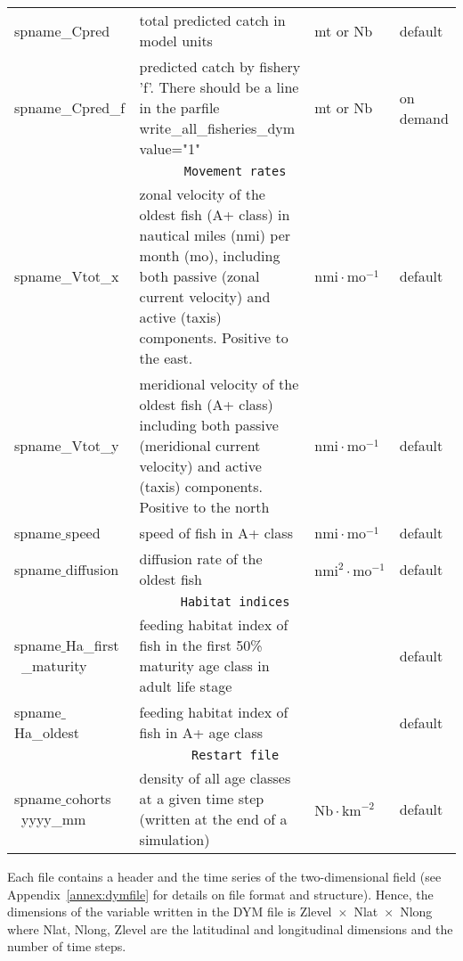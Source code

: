 \begin{longtable}{p{3.25cm}p{8cm}p{2cm}p{1.25cm}}
{\ttfamily spname\_Cpred}& total predicted catch in model units  &mt or Nb & default\\  
{\ttfamily spname\_Cpred\_f}& predicted catch by fishery 'f'. There should be a line in the parfile {\ttfamily write\_all\_fisheries\_dym value="1"} &mt or Nb& on demand\\
 \hline
 \multicolumn{4}{c}{\texttt{ Movement rates}} \\     
 \hline
{\ttfamily spname\_Vtot\_x}& zonal velocity of the oldest fish (A+ class) in nautical miles (nmi) per month (mo), including both passive (zonal current velocity) and active (taxis) components. Positive to the east. & $\text{nmi}\cdot\text{mo}^{-1}$ &  default\\
{\ttfamily spname\_Vtot\_y}& meridional velocity of the oldest fish (A+ class) including both passive (meridional current velocity) and active (taxis) components. Positive to the north & $\text{nmi}\cdot\text{mo}^{-1}$& default\\
{\ttfamily spname$\_$speed}& speed of fish in A+ class & $\text{nmi}\cdot\text{mo}^{-1}$   & default\\
{\ttfamily spname$\_$diffusion} & diffusion rate of the oldest fish  & $\text{nmi}^{2}\cdot\text{mo}^{-1}$ & default\\
 \hline
 \multicolumn{4}{c}{\texttt{ Habitat indices}} \\     
 \hline
{\ttfamily spname$\_$Ha\_first} {\ttfamily \mbox{   }\_maturity}& feeding habitat index of fish in the first 50\% maturity age class in adult life stage& &default\\   
{\ttfamily spname$\_$Ha\_oldest}& feeding habitat index of fish in A+ age class& &default\\   
 \hline
 \multicolumn{4}{c}{\texttt{ Restart file}} \\     
 \hline 
 {\ttfamily spname$\_$cohorts} {\ttfamily \mbox{   }yyyy\_mm}& density of all age classes at a given time step (written at the end of a simulation)& $\text{Nb}\cdot \text{km}^{-2}$ & default\\
 \hline
\end{longtable} 


Each file contains a header and the time series of the two-dimensional field (see Appendix~\ref{annex:dymfile} for details on file format and structure). Hence, the dimensions of the variable written in the DYM file is Zlevel~$\times$~Nlat~$\times$~Nlong
where Nlat, Nlong, Zlevel are the latitudinal and longitudinal dimensions and the number of time steps. 

